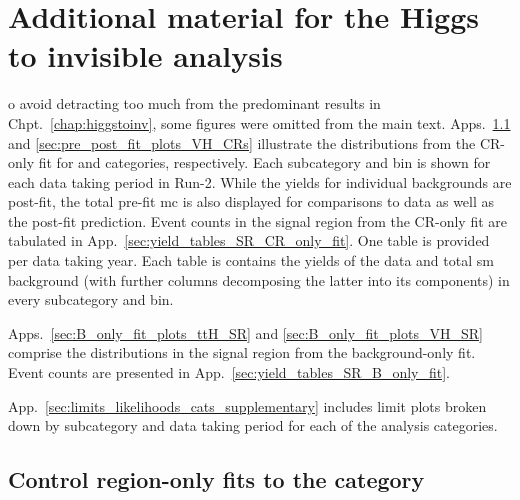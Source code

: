 \chapter{Additional material for the Higgs to invisible analysis}
\label{app:supplementary_hinv_plots}

o avoid detracting too much from the predominant results in Chpt.~\ref{chap:higgstoinv}, some figures were omitted from the main text. Apps.~\ref{sec:pre_post_fit_plots_ttH_CRs} and \ref{sec:pre_post_fit_plots_VH_CRs} illustrate the distributions from the \gls{CR}-only fit for \ttH and \VH categories, respectively. Each subcategory and \ptmiss bin is shown for each data taking period in Run-2. While the yields for individual backgrounds are post-fit, the total pre-fit \acrshort{mc} is also displayed for comparisons to data as well as the post-fit prediction. Event counts in the signal region from the \gls{CR}-only fit are tabulated in App.~\ref{sec:yield_tables_SR_CR_only_fit}. One table is provided per data taking year. Each table is contains the yields of the data and total \acrshort{sm} background (with further columns decomposing the latter into its components) in every subcategory and \ptmiss bin.

Apps.~\ref{sec:B_only_fit_plots_ttH_SR} and \ref{sec:B_only_fit_plots_VH_SR} comprise the distributions in the signal region from the background-only fit. Event counts are presented in App.~\ref{sec:yield_tables_SR_B_only_fit}.

App.~\ref{sec:limits_likelihoods_cats_supplementary} includes limit plots broken down by subcategory and data taking period for each of the analysis categories.




\section{Control region-only fits to the \texorpdfstring{\ttH}{ttH} category}
\label{sec:pre_post_fit_plots_ttH_CRs}

